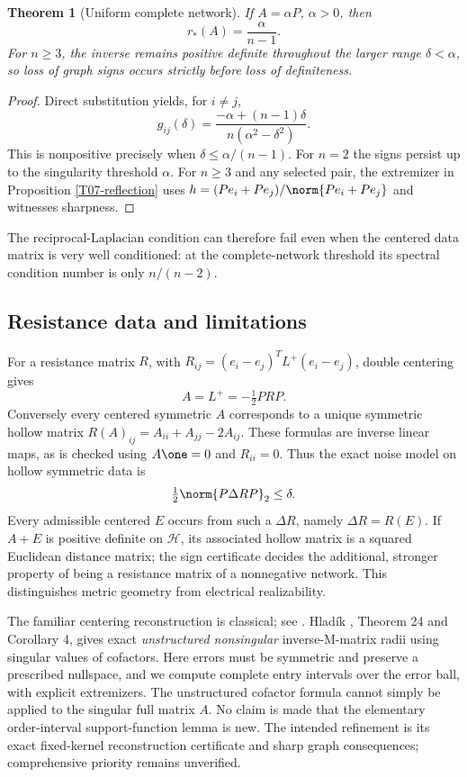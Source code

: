 \documentclass[11pt,a4paper]{article}
\newtheorem{theorem}{Theorem}[section]
\theoremstyle{definition}\newtheorem{definition}[theorem]{Definition}
\theoremstyle{remark}\newtheorem{remark}[theorem]{Remark}
\numberwithin{equation}{section}
\begin{document}
\begin{theorem}[Uniform complete network]
If $A=\alpha P$, $\alpha>0$, then
\[
 r_*(A)=\frac{\alpha}{n-1}.
\]
For $n\ge3$, the inverse remains positive definite throughout the larger range $\delta<\alpha$, so loss of graph signs occurs strictly before loss of definiteness.
\end{theorem}
\begin{proof}
Direct substitution yields, for $i\ne j$,
\[
 g_{ij}(\delta)=\frac{-\alpha+(n-1)\delta}{n(\alpha^2-\delta^2)}.
\]
This is nonpositive precisely when $\delta\le\alpha/(n-1)$. For $n=2$ the signs persist up to the singularity threshold $\alpha$. For $n\ge3$ and any selected pair, the extremizer in Proposition \ref{T07-reflection} uses
$h=(Pe_i+Pe_j)/\norm{Pe_i+Pe_j}$ and witnesses sharpness.
\end{proof}
The reciprocal-Laplacian condition can therefore fail even when the centered data matrix is very well conditioned: at the complete-network threshold its spectral condition number is only $n/(n-2)$.

\subsection{Resistance data and limitations}\label{T07-sec-4}
For a resistance matrix $R$, with $R_{ij}=(e_i-e_j)^TL^+(e_i-e_j)$, double centering gives
\[
 A=L^+=-\tfrac12 PRP.
\]
Conversely every centered symmetric $A$ corresponds to a unique symmetric hollow matrix
$R(A)_{ij}=A_{ii}+A_{jj}-2A_{ij}$. These formulas are inverse linear maps, as is checked using $A\one=0$ and $R_{ii}=0$. Thus the exact noise model on hollow symmetric data is
\[
 \tfrac12\norm{P\Delta R P}_2\le\delta.
\]
Every admissible centered $E$ occurs from such a $\Delta R$, namely $\Delta R=R(E)$. If $A+E$ is positive definite on $\mathcal H$, its associated hollow matrix is a squared Euclidean distance matrix; the sign certificate decides the additional, stronger property of being a resistance matrix of a nonnegative network. This distinguishes metric geometry from electrical realizability.

The familiar centering reconstruction is classical; see \cite{ref049}. Hlad\'ik \cite{ref048}, Theorem 24 and Corollary 4, gives exact \emph{unstructured nonsingular} inverse-M-matrix radii using singular values of cofactors. Here errors must be symmetric and preserve a prescribed nullspace, and we compute complete entry intervals over the error ball, with explicit extremizers. The unstructured cofactor formula cannot simply be applied to the singular full matrix $A$. No claim is made that the elementary order-interval support-function lemma is new. The intended refinement is its exact fixed-kernel reconstruction certificate and sharp graph consequences; comprehensive priority remains unverified.
\end{document}
